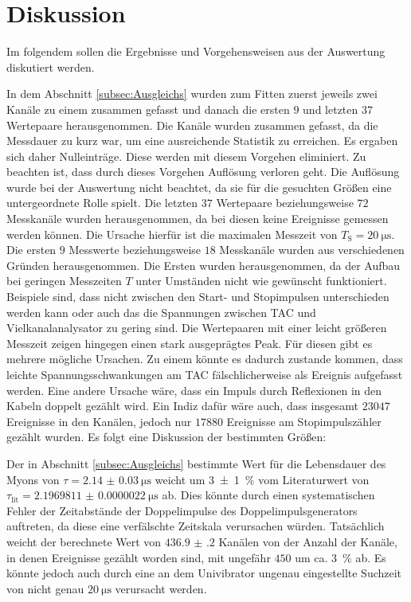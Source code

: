 
\section{Diskussion}
\label{sec:Diskussion}
Im folgendem sollen die Ergebnisse und Vorgehensweisen aus der Auswertung diskutiert werden.

In dem Abschnitt \ref{subsec:Ausgleichs} wurden zum Fitten zuerst jeweils zwei Kanäle zu einem zusammen gefasst und danach die ersten $9$ und letzten $37$ Wertepaare herausgenommen.
Die Kanäle wurden zusammen gefasst, da die Messdauer zu kurz war, um eine ausreichende Statistik zu erreichen. Es ergaben sich daher Nulleinträge. Diese werden mit diesem Vorgehen eliminiert. Zu beachten ist, dass durch dieses Vorgehen Auflösung verloren geht. Die Auflösung wurde bei der Auswertung nicht beachtet, da sie für die gesuchten Größen eine untergeordnete Rolle spielt. Die letzten $37$ Wertepaare beziehungsweise $72$ Messkanäle wurden herausgenommen, da bei diesen keine Ereignisse gemessen werden können. Die Ursache hierfür ist die maximalen Messzeit von $T_\text{S}=\SI{20}{\micro\second}$. Die ersten $9$ Messwerte beziehungsweise $18$ Messkanäle wurden aus verschiedenen Gründen herausgenommen. Die Ersten wurden herausgenommen, da der Aufbau bei geringen Messzeiten $T$ unter Umständen nicht wie gewünscht funktioniert. Beispiele sind, dass nicht zwischen den Start- und Stopimpulsen unterschieden werden kann oder auch das die Spannungen zwischen TAC und Vielkanalanalysator zu gering sind. Die Wertepaaren mit einer leicht größeren Messzeit zeigen hingegen einen stark ausgeprägtes Peak. Für diesen gibt es mehrere mögliche Ursachen. Zu einem könnte es dadurch zustande kommen, dass leichte Spannungsschwankungen am TAC fälschlicherweise als Ereignis aufgefasst werden. Eine andere Ursache wäre, dass ein Impuls  durch Reflexionen in den Kabeln doppelt gezählt wird. Ein Indiz dafür wäre auch, dass insgesamt $23047$ Ereignisse in den Kanälen, jedoch nur $17880$ Ereignisse am Stopimpulszähler gezählt wurden.
Es folgt eine Diskussion der bestimmten Größen:

Der in Abschnitt \ref{subsec:Ausgleichs} bestimmte Wert für die Lebensdauer des Myons von $\tau=\SI{2.14(3)}{\micro\second}$ weicht um \SI{3(1)}{\percent} vom Literaturwert von $\tau_\text{lit}=\SI{2.1969811(22)}{\micro\second}$ \cite{ParticlePhysics} ab. Dies könnte durch einen systematischen Fehler der Zeitabstände der Doppelimpulse des Doppelimpulsgenerators auftreten, da diese eine verfälschte Zeitskala verursachen würden. Tatsächlich weicht der berechnete Wert von $\num{436.9(2)}$ Kanälen von der Anzahl der Kanäle, in denen Ereignisse gezählt worden sind, mit ungefähr $450$ um ca. \SI{3}{\percent} ab. 
Es könnte jedoch auch durch eine an dem Univibrator ungenau eingestellte Suchzeit von nicht genau $\SI{20}{\micro\second}$ verursacht werden.

